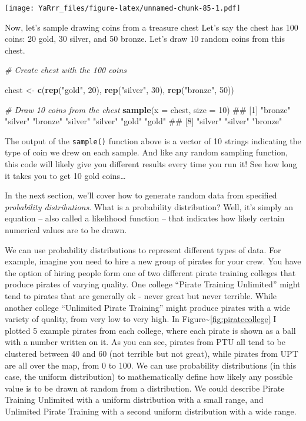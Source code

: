 \documentclass[]{book}
\newenvironment{Shaded}{\begin{snugshade}}{\end{snugshade}}
\newcommand{\KeywordTok}[1]{\textcolor[rgb]{0.13,0.29,0.53}{\textbf{{#1}}}}
\newcommand{\DataTypeTok}[1]{\textcolor[rgb]{0.13,0.29,0.53}{{#1}}}
\newcommand{\DecValTok}[1]{\textcolor[rgb]{0.00,0.00,0.81}{{#1}}}
\newcommand{\StringTok}[1]{\textcolor[rgb]{0.31,0.60,0.02}{{#1}}}
\newcommand{\CommentTok}[1]{\textcolor[rgb]{0.56,0.35,0.01}{\textit{{#1}}}}
\newcommand{\NormalTok}[1]{{#1}}
\theoremstyle{definition}
\theoremstyle{definition}
\theoremstyle{remark}
\begin{document}
\texttt{[image: YaRrr\_files/figure-latex/unnamed-chunk-85-1.pdf]}

Now, let's sample drawing coins from a treasure chest Let's say the
chest has 100 coins: 20 gold, 30 silver, and 50 bronze. Let's draw 10
random coins from this chest.

\begin{Shaded}
\begin{Highlighting}[]
\CommentTok{# Create chest with the 100 coins}

\NormalTok{chest <-}\StringTok{ }\KeywordTok{c}\NormalTok{(}\KeywordTok{rep}\NormalTok{(}\StringTok{"gold"}\NormalTok{, }\DecValTok{20}\NormalTok{),}
         \KeywordTok{rep}\NormalTok{(}\StringTok{"silver"}\NormalTok{, }\DecValTok{30}\NormalTok{),}
         \KeywordTok{rep}\NormalTok{(}\StringTok{"bronze"}\NormalTok{, }\DecValTok{50}\NormalTok{))}

\CommentTok{# Draw 10 coins from the chest}
\KeywordTok{sample}\NormalTok{(}\DataTypeTok{x =} \NormalTok{chest,}
       \DataTypeTok{size =} \DecValTok{10}\NormalTok{)}
\NormalTok{##  [1] "bronze" "silver" "bronze" "silver" "silver" "gold"   "gold"  }
\NormalTok{##  [8] "silver" "silver" "bronze"}
\end{Highlighting}
\end{Shaded}

The output of the \texttt{sample()} function above is a vector of 10
strings indicating the type of coin we drew on each sample. And like any
random sampling function, this code will likely give you different
results every time you run it! See how long it takes you to get 10 gold
coins\ldots{}

In the next section, we'll cover how to generate random data from
specified \emph{probability distributions}. What is a probability
distribution? Well, it's simply an equation -- also called a likelihood
function -- that indicates how likely certain numerical values are to be
drawn.

We can use probability distributions to represent different types of
data. For example, imagine you need to hire a new group of pirates for
your crew. You have the option of hiring people form one of two
different pirate training colleges that produce pirates of varying
quality. One college ``Pirate Training Unlimited'' might tend to pirates
that are generally ok - never great but never terrible. While another
college ``Unlimited Pirate Training'' might produce pirates with a wide
variety of quality, from very low to very high. In
Figure\textasciitilde{}\ref{fig:piratecollege} I plotted 5 example
pirates from each college, where each pirate is shown as a ball with a
number written on it. As you can see, pirates from PTU all tend to be
clustered between 40 and 60 (not terrible but not great), while pirates
from UPT are all over the map, from 0 to 100. We can use probability
distributions (in this case, the uniform distribution) to mathematically
define how likely any possible value is to be drawn at random from a
distribution. We could describe Pirate Training Unlimited with a uniform
distribution with a small range, and Unlimited Pirate Training with a
second uniform distribution with a wide range.
\end{document}
